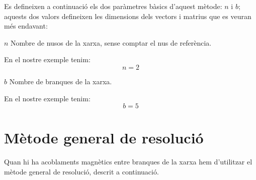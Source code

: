 Es defineixen a continuació els dos
paràmetres bàsics d'aquest mètode: $n$ i $b$; aquests dos valors
defineixen les dimensions dels vectors i matrius que es veuran més
endavant:
\begin{list}{}
   {\setlength{\labelwidth}{7mm} \setlength{\leftmargin}{9mm} \setlength{\labelsep}{2mm}}
   \item[$n$] Nombre de nusos de la xarxa, sense comptar el nus de referència.

   En el nostre exemple tenim:
   \[ n=2 \]

   \item[$b$] Nombre de branques de la xarxa.

   En el nostre exemple tenim:
   \[ b=5 \]
\end{list}

\section{Mètode general de resolució}

Quan hi ha acoblaments
magnètics entre branques de la xarxa hem d'utilitzar el mètode
general de resolució, descrit a continuació.

